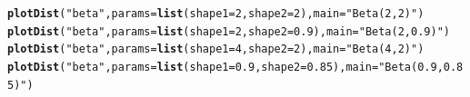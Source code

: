 \documentclass[twoside]{book}\usepackage[]{graphicx}\usepackage[]{xcolor}
\makeatletter
\newcommand{\hlnum}[1]{\textcolor[rgb]{0.686,0.059,0.569}{#1}}%
\newcommand{\hlstr}[1]{\textcolor[rgb]{0.192,0.494,0.8}{#1}}%
\newcommand{\hlstd}[1]{\textcolor[rgb]{0.345,0.345,0.345}{#1}}%
\newcommand{\hlkwc}[1]{\textcolor[rgb]{0.333,0.667,0.333}{#1}}%
\newcommand{\hlkwd}[1]{\textcolor[rgb]{0.737,0.353,0.396}{\textbf{#1}}}%
\newenvironment{kframe}{%
 \def\at@end@of@kframe{}%
 \ifinner\ifhmode%
  \def\at@end@of@kframe{\end{minipage}}%
  \begin{minipage}{\columnwidth}%
 \fi\fi%
 \def\FrameCommand##1{\hskip\@totalleftmargin \hskip-\fboxsep
 \colorbox{shadecolor}{##1}\hskip-\fboxsep
     \hskip-\linewidth \hskip-\@totalleftmargin \hskip\columnwidth}%
 \MakeFramed {\advance\hsize-\width
   \@totalleftmargin\z@ \linewidth\hsize
   \@setminipage}}%
 {\par\unskip\endMakeFramed%
 \at@end@of@kframe}
\newenvironment{knitrout}{}{} %
\makeatother
\begin{document}
\begin{knitrout}
\color{fgcolor}\begin{kframe}
\begin{alltt}
\hlkwd{plotDist}\hlstd{(}\hlstr{"beta"}\hlstd{,} \hlkwc{params} \hlstd{=} \hlkwd{list}\hlstd{(}\hlkwc{shape1} \hlstd{=} \hlnum{2}\hlstd{,} \hlkwc{shape2} \hlstd{=} \hlnum{2}\hlstd{),} \hlkwc{main} \hlstd{=} \hlstr{"Beta(2,2)"}\hlstd{)}
\hlkwd{plotDist}\hlstd{(}\hlstr{"beta"}\hlstd{,} \hlkwc{params} \hlstd{=} \hlkwd{list}\hlstd{(}\hlkwc{shape1} \hlstd{=} \hlnum{2}\hlstd{,} \hlkwc{shape2} \hlstd{=} \hlnum{0.9}\hlstd{),} \hlkwc{main} \hlstd{=} \hlstr{"Beta(2,0.9)"}\hlstd{)}
\hlkwd{plotDist}\hlstd{(}\hlstr{"beta"}\hlstd{,} \hlkwc{params} \hlstd{=} \hlkwd{list}\hlstd{(}\hlkwc{shape1} \hlstd{=} \hlnum{4}\hlstd{,} \hlkwc{shape2} \hlstd{=} \hlnum{2}\hlstd{),} \hlkwc{main} \hlstd{=} \hlstr{"Beta(4,2)"}\hlstd{)}
\hlkwd{plotDist}\hlstd{(}\hlstr{"beta"}\hlstd{,} \hlkwc{params} \hlstd{=} \hlkwd{list}\hlstd{(}\hlkwc{shape1} \hlstd{=} \hlnum{0.9}\hlstd{,} \hlkwc{shape2} \hlstd{=} \hlnum{0.85}\hlstd{),} \hlkwc{main} \hlstd{=} \hlstr{"Beta(0.9,0.85)"}\hlstd{)}
\end{alltt}
\end{kframe}


\end{knitrout}
\end{document}
